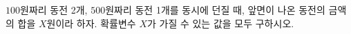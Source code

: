 $100$원짜리 동전 2개, $500$원짜리 동전 1개를 동시에 던질 때, 앞면이 나온 동전의 금액의 합을 $X$원이라 하자. 확률변수 $X$가 가질 수 있는 값을 모두 구하시오.
